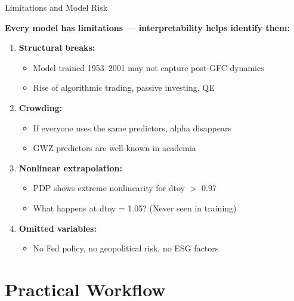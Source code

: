 \documentclass[10pt]{beamer}
\begin{document}
\begin{frame}{Limitations and Model Risk}

  \textbf{Every model has limitations --- interpretability helps identify them:}

  \vspace{0.5em}
  \begin{enumerate}
    \item \textbf{Structural breaks:}
    \begin{itemize}
      \item Model trained 1953--2001 may not capture post-GFC dynamics
      \item Rise of algorithmic trading, passive investing, QE
    \end{itemize}

    \vspace{0.3em}
    \item \textbf{Crowding:}
    \begin{itemize}
      \item If everyone uses the same predictors, alpha disappears
      \item GWZ predictors are well-known in academia
    \end{itemize}

    \vspace{0.3em}
    \item \textbf{Nonlinear extrapolation:}
    \begin{itemize}
      \item PDP shows extreme nonlinearity for dtoy $>$ 0.97
      \item What happens at dtoy = 1.05? (Never seen in training)
    \end{itemize}

    \vspace{0.3em}
    \item \textbf{Omitted variables:}
    \begin{itemize}
      \item No Fed policy, no geopolitical risk, no ESG factors
    \end{itemize}
  \end{enumerate}
\end{frame}

\section{Practical Workflow}
\end{document}

